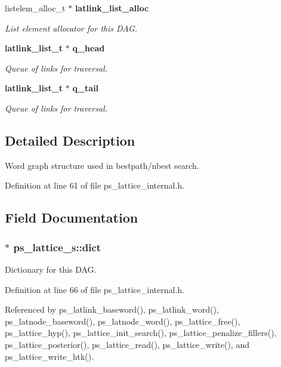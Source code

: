 \begin{DoxyCompactItemize}
listelem\+\_\+alloc\+\_\+t $\ast$ {\bf latlink\+\_\+list\+\_\+alloc}
\begin{DoxyCompactList}\small\item\em List element allocator for this D\+A\+G. \end{DoxyCompactList}\item 
{\bf latlink\+\_\+list\+\_\+t} $\ast$ {\bf q\+\_\+head}
\begin{DoxyCompactList}\small\item\em Queue of links for traversal. \end{DoxyCompactList}\item 
{\bf latlink\+\_\+list\+\_\+t} $\ast$ {\bf q\+\_\+tail}
\begin{DoxyCompactList}\small\item\em Queue of links for traversal. \end{DoxyCompactList}\end{DoxyCompactItemize}


\subsection{Detailed Description}
Word graph structure used in bestpath/nbest search. 

Definition at line 61 of file ps\+\_\+lattice\+\_\+internal.\+h.



\subsection{Field Documentation}
\subsubsection[{dict}]{$\ast$ ps\+\_\+lattice\+\_\+s\+::dict}\label{structps__lattice__s_a71865c59fae65743ef3c6b5aceb17da6}


Dictionary for this D\+A\+G. 



Definition at line 66 of file ps\+\_\+lattice\+\_\+internal.\+h.



Referenced by ps\+\_\+latlink\+\_\+baseword(), ps\+\_\+latlink\+\_\+word(), ps\+\_\+latnode\+\_\+baseword(), ps\+\_\+latnode\+\_\+word(), ps\+\_\+lattice\+\_\+free(), ps\+\_\+lattice\+\_\+hyp(), ps\+\_\+lattice\+\_\+init\+\_\+search(), ps\+\_\+lattice\+\_\+penalize\+\_\+fillers(), ps\+\_\+lattice\+\_\+posterior(), ps\+\_\+lattice\+\_\+read(), ps\+\_\+lattice\+\_\+write(), and ps\+\_\+lattice\+\_\+write\+\_\+htk().

